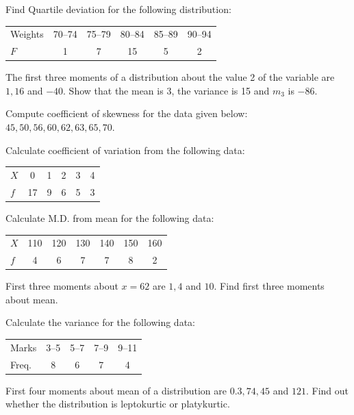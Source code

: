\documentclass[11pt,a4paper]{article}
\begin{document}
\begin{longlist}
\item Find Quartile deviation for the following distribution:
\begin{center}
\begin{tabular}{l|ccccc}
Weights & 70--74 & 75--79 & 80--84 & 85--89 & 90--94 \\
$F$ & 1 & 7 & 15 & 5 & 2
\end{tabular}
\end{center}

\item The first three moments of a distribution about the value 2 of the variable are $1, 16$ and $-40$. Show that the mean is 3, the variance is 15 and $m_3$ is $-86$.

\item Compute coefficient of skewness for the data given below: $45,50,56,60,62,63,65,70$.

\item Calculate coefficient of variation from the following data:
\begin{center}
\begin{tabular}{l|ccccc}
$X$ & 0 & 1 & 2 & 3 & 4 \\
$f$ & 17 & 9 & 6 & 5 & 3
\end{tabular}
\end{center}

\item Calculate M.D. from mean for the following data:
\begin{center}
\begin{tabular}{l|cccccc}
$X$ & 110 & 120 & 130 & 140 & 150 & 160 \\
$f$ & 4 & 6 & 7 & 7 & 8 & 2
\end{tabular}
\end{center}

\item First three moments about $x=62$ are $1, 4$ and $10$. Find first three moments about mean.

\item Calculate the variance for the following data:
\begin{center}
\begin{tabular}{l|cccc}
Marks & 3--5 & 5--7 & 7--9 & 9--11 \\
Freq. & 8 & 6 & 7 & 4
\end{tabular}
\end{center}

\item First four moments about mean of a distribution are $0.3, 74, 45$ and $121$. Find out whether the distribution is leptokurtic or platykurtic.


\end{longlist}
\end{document}
